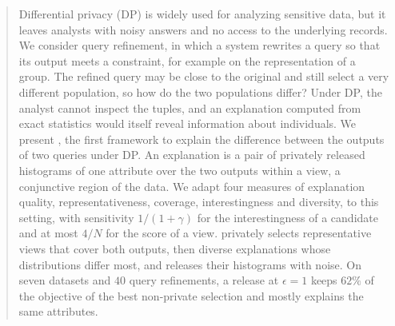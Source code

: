 \begin{abstract}
Differential privacy (DP) is widely used for analyzing sensitive data, but it leaves analysts with noisy answers and no access to the underlying records.
We consider query refinement, in which a system rewrites a query so that its output meets a constraint, for example on the representation of a group.
The refined query may be close to the original and still select a very different population, so how do the two populations differ?
Under DP, the analyst cannot inspect the tuples, and an explanation computed from exact statistics would itself reveal information about individuals.
We present \sys{}, the first framework to explain the difference between the outputs of two queries under DP.
An explanation is a pair of privately released histograms of one attribute over the two outputs within a view, a conjunctive region of the data.
We adapt four measures of explanation quality, representativeness, coverage, interestingness and diversity, to this setting, with sensitivity $1/(1+\gamma)$ for the interestingness of a candidate and at most $4/N$ for the score of a view.
\sys{} privately selects representative views that cover both outputs, then diverse explanations whose distributions differ most, and releases their histograms with noise.
On seven datasets and $40$ query refinements, a release at $\epsilon=1$ keeps $62\%$ of the objective of the best non-private selection and mostly explains the same attributes.

\end{abstract}
